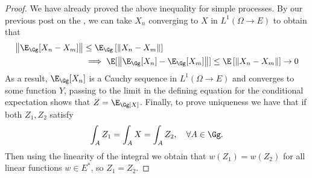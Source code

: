 \documentclass[
    a4paper,
    DIV=14,
    abstract=true,
    numbers=noenddot
]{scrartcl}
\begin{document}
\begin{proof}
	We have already proved the above inequality for simple processes. By our previous post on the , we can take $X_n$ converging to $X$ in $L^1(\Omega\to E)$ to obtain that
	\begin{align*}
		\left\|\E_{\Gg}[X_n-X_m]\right\|&\leq\E_{\Gg}\left[\|X_n-X_m\|\right]\\&\implies \E[\left\|\E_{\Gg}[X_n]-\E_{\Gg}[X_m]\right\|]\leq \E\left[\|X_n-X_m\|\right]\to 0
	\end{align*}
	As a result, $\E_{\Gg}[X_n]$ is a Cauchy sequence in $L^1(\Omega\to E)$ and converges to some function $Y$, passing to the limit in the defining equation for the conditional expectation shows that $Z=\E_\Gg[X]$. Finally, to prove uniqueness we have that if both $Z_1,Z_2$ satisfy
	\begin{equation*}
		\int_A Z_1=\int_A X=\int_A Z_2,\quad \forall A\in\Gg.
	\end{equation*}
	Then using the linearity of the integral we obtain that $w(Z_1)=w(Z_2)$ for all linear functions $w \in E^*$, so $Z_1=Z_2$.
\end{proof}
\end{document}
